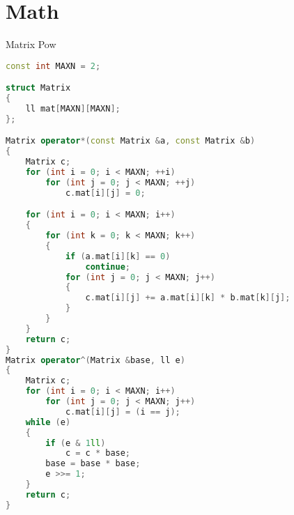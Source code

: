 \documentclass[leter]{amsart}
\begin{document}
\section{Math}
Matrix Pow
\begin{multicols}{2}
\begin{lstlisting}[language=C++]
const int MAXN = 2;

struct Matrix
{
    ll mat[MAXN][MAXN];
};

Matrix operator*(const Matrix &a, const Matrix &b)
{
    Matrix c;
    for (int i = 0; i < MAXN; ++i)
        for (int j = 0; j < MAXN; ++j)
            c.mat[i][j] = 0;

    for (int i = 0; i < MAXN; i++)
    {
        for (int k = 0; k < MAXN; k++)
        {
            if (a.mat[i][k] == 0)
                continue;
            for (int j = 0; j < MAXN; j++)
            {
                c.mat[i][j] += a.mat[i][k] * b.mat[k][j];
            }
        }
    }
    return c;
}
Matrix operator^(Matrix &base, ll e)
{
    Matrix c;
    for (int i = 0; i < MAXN; i++)
        for (int j = 0; j < MAXN; j++)
            c.mat[i][j] = (i == j);
    while (e)
    {
        if (e & 1ll)
            c = c * base;
        base = base * base;
        e >>= 1;
    }
    return c;
}

\end{lstlisting}
\end{multicols}
\end{document}
